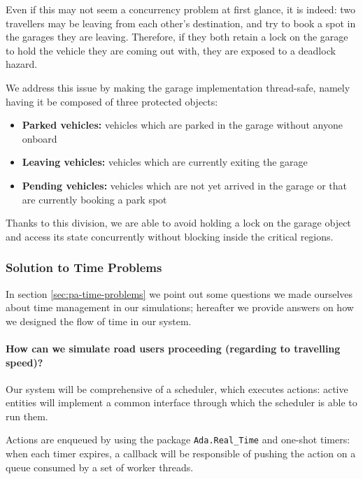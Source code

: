 Even if this may not seem a concurrency problem at first glance, it is indeed:
two travellers may be leaving from each other's destination, and try to book a
spot in the garages they are leaving.
Therefore, if they both retain a lock on the garage to hold the vehicle they
are coming out with, they are exposed to a deadlock hazard.

We address this issue by making the garage implementation thread-safe, namely
having it be composed of three protected objects:

\begin{itemize}
  \item \textbf{Parked vehicles:} vehicles which are parked in the garage
    without anyone onboard
  \item \textbf{Leaving vehicles:} vehicles which are currently exiting the
    garage
  \item \textbf{Pending vehicles:} vehicles which are not yet arrived in the
    garage or that are currently booking a park spot
\end{itemize}

Thanks to this division, we are able to avoid holding a lock on the garage
object and access its state concurrently without blocking inside the critical
regions.


\subsubsection{Solution to Time Problems}

In section \ref{sec:pa-time-problems} we point out some questions we made
ourselves about time management in our simulations; hereafter we provide
answers on how we designed the flow of time in our system.

\paragraph{How can we simulate road users proceeding (regarding to travelling
  speed)?}
Our system will be comprehensive of a scheduler, which executes actions:
active entities will implement a common interface through which the scheduler
is able to run them.

Actions are enqueued by using the package \texttt{Ada.Real\_Time} and one-shot
timers: when each timer expires, a callback will be responsible of pushing the
action on a queue consumed by a set of worker threads.

